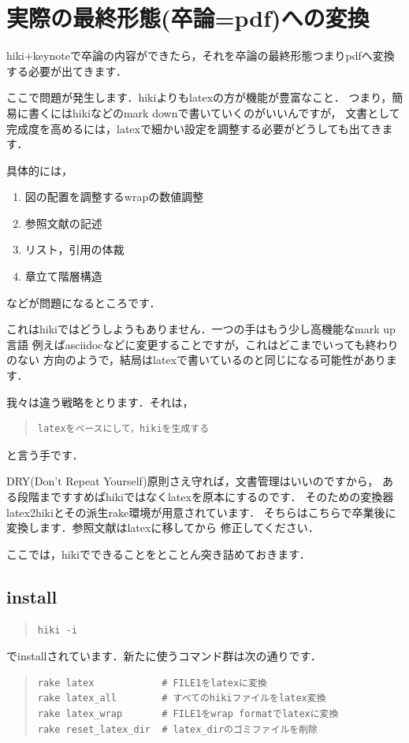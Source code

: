 
\section{実際の最終形態(卒論=pdf)への変換}
hiki+keynoteで卒論の内容ができたら，それを卒論の最終形態つまりpdfへ変換する必要が出てきます．

ここで問題が発生します．hikiよりもlatexの方が機能が豊富なこと．
つまり，簡易に書くにはhikiなどのmark downで書いていくのがいいんですが，
文書として完成度を高めるには，latexで細かい設定を調整する必要がどうしても出てきます．

具体的には，

\begin{enumerate}
\item 図の配置を調整するwrapの数値調整
\item 参照文献の記述
\item リスト，引用の体裁
\item 章立て階層構造
\end{enumerate}
などが問題になるところです．

これはhikiではどうしようもありません．一つの手はもう少し高機能なmark up言語
例えばasciidocなどに変更することですが，これはどこまでいっても終わりのない
方向のようで，結局はlatexで書いているのと同じになる可能性があります．

我々は違う戦略をとります．それは，
\begin{quote}\begin{verbatim}
latexをベースにして，hikiを生成する
\end{verbatim}\end{quote}
と言う手です．

DRY(Don't Repeat Yourself)原則さえ守れば，文書管理はいいのですから，
ある段階まですすめばhikiではなくlatexを原本にするのです．
そのための変換器latex2hikiとその派生rake環境が用意されています．
そちらはこちらで卒業後に変換します．参照文献はlatexに移してから
修正してください．

ここでは，hikiでできることをとことん突き詰めておきます．

\subsection{install}\begin{quote}\begin{verbatim}
hiki -i
\end{verbatim}\end{quote}
でinstallされています．新たに使うコマンド群は次の通りです．
\begin{quote}\begin{verbatim}
rake latex            # FILE1をlatexに変換
rake latex_all        # すべてのhikiファイルをlatex変換
rake latex_wrap       # FILE1をwrap formatでlatexに変換
rake reset_latex_dir  # latex_dirのゴミファイルを削除
\end{verbatim}\end{quote}
